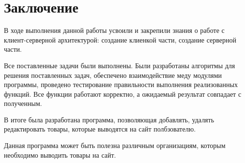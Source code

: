 \newpage

\section*{Заключение}

В ходе выполнения данной работы усвоили и закрепили знания о работе с клиент-серверной архитектурой:
создание клиенкой части, создание серверной части.

Все поставленные задачи были выполнены.
Были разработаны алгоритмы для решения поставленных задач,
обеспечено взаимодействие меду модулями программы,
проведено тестирование правильности выполнения реализованных функций.
Все функции работают корректно, а ожидаемый результат совпадает с полученным.
	
В итоге была разработана программа,
позволяющая добавлять, удалять редактировать товары, которые выводятся на сайт полбзователю.

Данная программа может быть полезна различным организациям,
которым необходимо выводить товары на сайт.

\newpage
